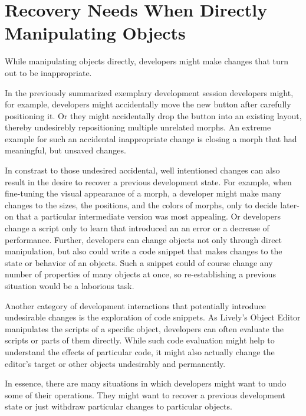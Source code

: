 


\section{Recovery Needs When Directly Manipulating Objects}

While manipulating objects directly, developers might make changes that turn out to be inappropriate.

In the previously summarized exemplary development session developers might, for example, developers might accidentally move the new button after carefully positioning it.
Or they might accidentally drop the button into an existing layout, thereby undesirebly repositioning multiple unrelated morphs.
An extreme example for such an accidental inappropriate change is closing a morph that had meaningful, but unsaved changes.

In constrast to those undesired accidental, well intentioned changes can also result in the desire to recover a previous development state.
For example, when fine-tuning the visual appearance of a morph, a developer might make many changes to the sizes, the positions, and the colors of morphs, only to decide later-on that a particular intermediate version was most appealing.
Or developers change a script only to learn that introduced an an error or a decrease of performance.
Further, developers can change objects not only through direct manipulation, but also could write a code snippet that makes changes to the state or behavior of an objects.
Such a snippet could of course change any number of properties of many objects at once, so re-establishing a previous situation would be a laborious task.

Another category of development interactions that potentially introduce undesirable changes is the exploration of code snippets.
As Lively's Object Editor manipulates the scripts of a specific object, developers can often evaluate the scripts or parts of them directly.
While such code evaluation might help to understand the effects of particular code, it might also actually change the editor's target or other objects undesirably and permanently.

In essence, there are many situations in which developers might want to undo some of their operations.
They might want to recover a previous development state or just withdraw particular changes to particular objects.

